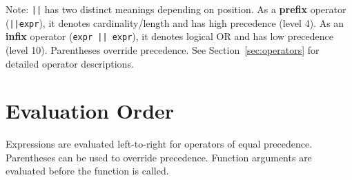 Note: \texttt{||} has two distinct meanings depending on position. As a \textbf{prefix} operator (\texttt{||expr}), it denotes cardinality/length and has high precedence (level 4). As an \textbf{infix} operator (\texttt{expr || expr}), it denotes logical OR and has low precedence (level 10). Parentheses override precedence. See Section~\ref{sec:operators} for detailed operator descriptions.

\section{Evaluation Order}
Expressions are evaluated left-to-right for operators of equal precedence. Parentheses can be used to override precedence. Function arguments are evaluated before the function is called.

